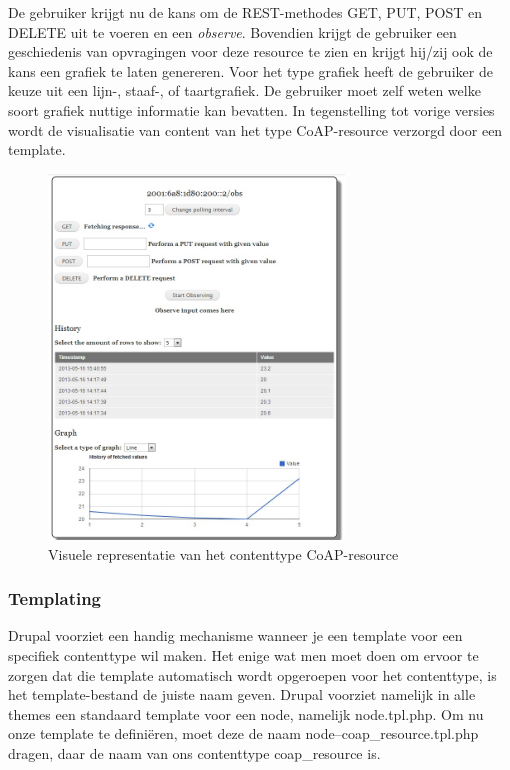 De gebruiker krijgt nu de kans om de REST-methodes  GET, PUT, POST en DELETE uit te voeren en een \textit{observe}. Bovendien krijgt de gebruiker een geschiedenis van opvragingen voor deze resource te zien en krijgt hij/zij ook de kans een grafiek te laten genereren. Voor het type grafiek heeft de gebruiker de keuze uit een lijn-, staaf-, of taartgrafiek. De gebruiker moet zelf weten welke soort grafiek nuttige informatie kan bevatten. In tegenstelling tot vorige versies wordt de visualisatie van content van het type CoAP-resource verzorgd door een template.
\begin{figure}[h!]
\centering
\includegraphics[width=0.7\textwidth]{fig/coap_resource}
\caption{Visuele representatie van het contenttype CoAP-resource}
\label{fig:coapResource}
\end{figure}

\subsubsection{Templating}\label{templating}
Drupal voorziet een handig mechanisme wanneer je een template voor een specifiek contenttype wil maken. Het enige wat men moet doen om ervoor te zorgen dat die template automatisch wordt opgeroepen voor het contenttype, is het template-bestand de juiste naam geven. Drupal voorziet namelijk in alle themes een standaard template voor een node, namelijk node.tpl.php. Om nu onze template te defini\"{e}ren, moet deze de naam node--coap\_resource.tpl.php dragen, daar de naam van ons contenttype coap\_resource is.\\

